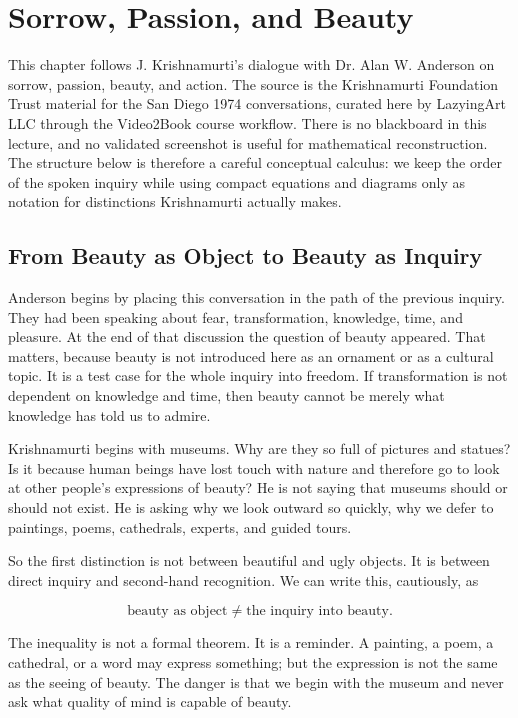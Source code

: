 \chapter{Sorrow, Passion, and Beauty}

This chapter follows J. Krishnamurti's dialogue with Dr. Alan W. Anderson on sorrow, passion, beauty, and action. The source is the Krishnamurti Foundation Trust material for the San Diego 1974 conversations, curated here by LazyingArt LLC through the Video2Book course workflow. There is no blackboard in this lecture, and no validated screenshot is useful for mathematical reconstruction. The structure below is therefore a careful conceptual calculus: we keep the order of the spoken inquiry while using compact equations and diagrams only as notation for distinctions Krishnamurti actually makes.

\section{From Beauty as Object to Beauty as Inquiry}

Anderson begins by placing this conversation in the path of the previous inquiry. They had been speaking about fear, transformation, knowledge, time, and pleasure. At the end of that discussion the question of beauty appeared. That matters, because beauty is not introduced here as an ornament or as a cultural topic. It is a test case for the whole inquiry into freedom. If transformation is not dependent on knowledge and time, then beauty cannot be merely what knowledge has told us to admire.

Krishnamurti begins with museums. Why are they so full of pictures and statues? Is it because human beings have lost touch with nature and therefore go to look at other people's expressions of beauty? He is not saying that museums should or should not exist. He is asking why we look outward so quickly, why we defer to paintings, poems, cathedrals, experts, and guided tours.

So the first distinction is not between beautiful and ugly objects. It is between direct inquiry and second-hand recognition. We can write this, cautiously, as

\begin{equation}
\text{beauty as object} \neq \text{the inquiry into beauty}.
\end{equation}

The inequality is not a formal theorem. It is a reminder. A painting, a poem, a cathedral, or a word may express something; but the expression is not the same as the seeing of beauty. The danger is that we begin with the museum and never ask what quality of mind is capable of beauty.

